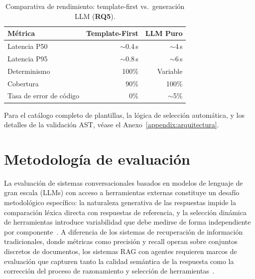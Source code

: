 \begin{table}[H]
\centering
\caption{Comparativa de rendimiento: template-first vs.\ generación \acs{LLM} (\textbf{RQ5}).}
\label{tab:metricas_viz}
\footnotesize
\begin{tabularx}{\columnwidth}{Xrr}
\toprule
\textbf{Métrica} & \textbf{Template-First} & \textbf{LLM Puro} \\
\midrule
Latencia P50 & $\sim$0.4\,s & $\sim$4\,s \\
Latencia P95 & $\sim$0.8\,s & $\sim$6\,s \\
Determinismo & 100\% & Variable \\
Cobertura & 90\% & 100\% \\
Tasa de error de código & 0\% & $\sim$5\% \\
\bottomrule
\end{tabularx}
\end{table}

Para el catálogo completo de plantillas, la lógica de selección automática, y los detalles de la validación \ac{AST}, véase el Anexo~\ref{appendix:arquitectura}.


\section{Metodología de evaluación}
\label{sec:metodologia_evaluacion}

La evaluación de sistemas conversacionales basados en modelos de lenguaje de gran escala (\ac{LLM}s) con acceso a herramientas externas constituye un desafío metodológico específico: la naturaleza generativa de las respuestas impide la comparación léxica directa con respuestas de referencia, y la selección dinámica de herramientas introduce variabilidad que debe medirse de forma independiente por componente~\parencite{Gan2025rageval,Yu2025agentjudge}. A diferencia de los sistemas de recuperación de información tradicionales, donde métricas como precisión y recall operan sobre conjuntos discretos de documentos, los sistemas \ac{RAG} con agentes requieren marcos de evaluación que capturen tanto la calidad semántica de la respuesta como la corrección del proceso de razonamiento y selección de herramientas~\parencite{xiong2024medrag}.


